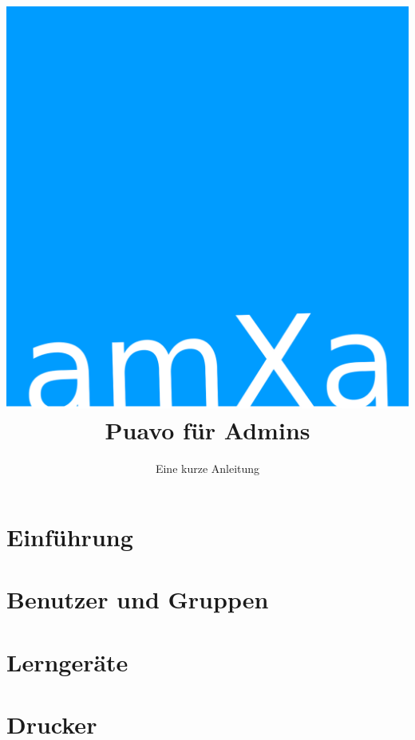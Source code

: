 




\title{\includegraphics[scale=0.08]{logo.png}\\[1em]Puavo für Admins}
\author{Eine kurze Anleitung}


 
\maketitle
\tableofcontents

\section{Einführung}

\section{Benutzer und Gruppen}

\section{Lerngeräte}


\section{Drucker}





